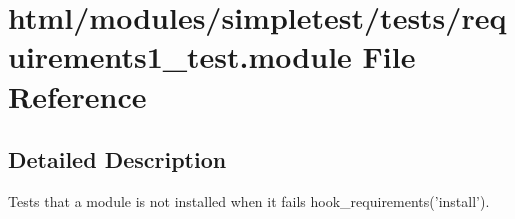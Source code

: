 \hypertarget{requirements1__test_8module}{
\section{html/modules/simpletest/tests/requirements1\_\-test.module File Reference}
\label{requirements1__test_8module}
}


\subsection{Detailed Description}
Tests that a module is not installed when it fails hook\_\-requirements('install'). 